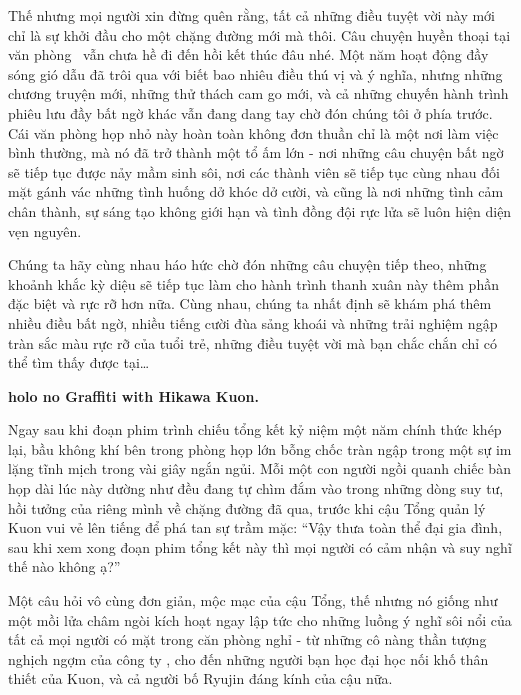 \documentclass[../main.tex]{subfiles}
\begin{document}
Thế nhưng mọi người xin đừng quên rằng, tất cả những điều tuyệt vời này mới chỉ là sự khởi đầu cho một chặng đường mới mà thôi. Câu chuyện huyền thoại tại văn phòng \hll\ vẫn chưa hề đi đến hồi kết thúc đâu nhé. Một năm hoạt động đầy sóng gió dẫu đã trôi qua với biết bao nhiêu điều thú vị và ý nghĩa, nhưng những chương truyện mới, những thử thách cam go mới, và cả những chuyến hành trình phiêu lưu đầy bất ngờ khác vẫn đang dang tay chờ đón chúng tôi ở phía trước. Cái văn phòng họp nhỏ này hoàn toàn không đơn thuần chỉ là một nơi làm việc bình thường, mà nó đã trở thành một tổ ấm lớn - nơi những câu chuyện bất ngờ sẽ tiếp tục được nảy mầm sinh sôi, nơi các thành viên sẽ tiếp tục cùng nhau đối mặt gánh vác những tình huống dở khóc dở cười, và cũng là nơi những tình cảm chân thành, sự sáng tạo không giới hạn và tình đồng đội rực lửa sẽ luôn hiện diện vẹn nguyên.

Chúng ta hãy cùng nhau háo hức chờ đón những câu chuyện tiếp theo, những khoảnh khắc kỳ diệu sẽ tiếp tục làm cho hành trình thanh xuân này thêm phần đặc biệt và rực rỡ hơn nữa. Cùng nhau, chúng ta nhất định sẽ khám phá thêm nhiều điều bất ngờ, nhiều tiếng cười đùa sảng khoái và những trải nghiệm ngập tràn sắc màu rực rỡ của tuổi trẻ, những điều tuyệt vời mà bạn chắc chắn chỉ có thể tìm thấy được tại\dots

\begin{center}
  \textbf{\Large holo no Graffiti with Hikawa Kuon.}
\end{center}

\omk

\pov{-}

Ngay sau khi đoạn phim trình chiếu tổng kết kỷ niệm một năm chính thức khép lại, bầu không khí bên trong phòng họp lớn bỗng chốc tràn ngập trong một sự im lặng tĩnh mịch trong vài giây ngắn ngủi. Mỗi một con người ngồi quanh chiếc bàn họp dài lúc này dường như đều đang tự chìm đắm vào trong những dòng suy tư, hồi tưởng của riêng mình về chặng đường đã qua, trước khi cậu Tổng quản lý Kuon vui vẻ lên tiếng để phá tan sự trầm mặc: ``Vậy thưa toàn thể đại gia đình, sau khi xem xong đoạn phim tổng kết này thì mọi người có cảm nhận và suy nghĩ thế nào không ạ?''

Một câu hỏi vô cùng đơn giản, mộc mạc của cậu Tổng, thế nhưng nó giống như một mồi lửa châm ngòi kích hoạt ngay lập tức cho những luồng ý nghĩ sôi nổi của tất cả mọi người có mặt trong căn phòng nghỉ - từ những cô nàng thần tượng nghịch ngợm của công ty \hll, cho đến những người bạn học đại học nối khố thân thiết của Kuon, và cả người bố Ryujin đáng kính của cậu nữa.
\end{document}
